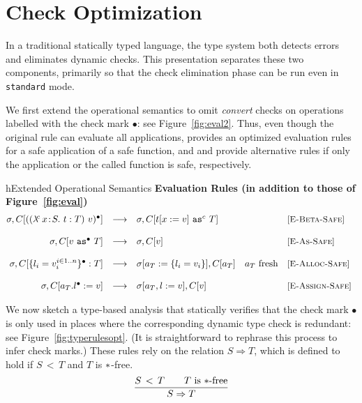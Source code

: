 \documentclass{article}
\newcommand{\myclearpage}{}
\newcommand{\safe}{\bullet}
\newcommand{\lam}[5]{\lambda\!^{#1}\,#2\!:\!#3.\,\,#5:#4}
\newcommand{\app}[3]{(#2~#3)^{#1}}
\newcommand{\dynamic}{\t{*}}
\newcommand{\cast}[3]{#2~\t{as}^{#1}~#3}
\newcommand{\subtypeword}{\,<\,}
\newcommand{\subtype}[2]{#1 \subtypeword #2}
\newcommand{\implies}[2]{#1\Implies #2}
\renewcommand{\t}[1]{{\tt #1}}
\newcommand{\Implies}[0]{\Rightarrow}
\newcommand{\red}[0]{\longrightarrow}  %
\newcommand{\lred}[0]{\red}  %
\newcommand{\objty}[1]{\{#1\}}
\newcommand{\obje}[3]{\{#2\}^{#1}:{#3}}
\newcommand{\objv}[1]{\{#1\}}
\newcommand{\objset}[4]{#2.#3^{#1}:=#4}
\begin{document}
\myclearpage
\section{Check Optimization}
\label{sec:opt}

In a traditional statically typed language, the type system both detects errors and eliminates dynamic checks.
This presentation separates these two components, primarily so that the check elimination phase 
can be run even in   \t{standard} mode.
 
We first extend the operational semantics to omit \emph{convert} checks on operations labelled with the check mark $\safe$: see Figure~\ref{fig:eval2}. Thus, even though the original rule  can evaluate all applications,  provides an optimized evaluation rules for a safe application of a safe function, and  and  provide alternative rules if only the application or the called function is safe, respectively.

\begin{displayfigure}{h}{Extended Operational Semantics}
\label{fig:eval2} 
\footnotesize
{\bf Evaluation Rules (in addition to those of Figure~\ref{fig:eval})}
\[
\begin{array}{@{}rclll}
	\sigma,C[{\app{\safe}{(\lam{c}{x}{S}{T}{t})}{v}}]
	&\lred&
	\sigma,C[\cast{c}{t[x:=v]}{T}]
	&&\rel{E-Beta-Safe}
\\~\\
	\sigma,C[\cast{\safe}{v}{T}]
	&\lred&
	\sigma,C[v]
	&&\rel{E-As-Safe}
\\~\\
	\sigma,C[\obje{\safe}{l_i=v_i^{i\in 1..n}}{T}]
	&\lred&
	\sigma[a_T:=\objv{l_i=v_i}],C[a_T] 
	&\mbox{$a_T$ fresh}
	&\rel{E-Alloc-Safe} 
\\~\\
	\sigma,C[\objset{\safe}{a_T}{l}{v}]
	&\lred&
	\sigma[a_T,l:=v],C[v] 
	& 
	&\rel{E-Assign-Safe} 
\end{array}
\]
 \end{displayfigure} 


We now sketch a type-based analysis that statically verifies that the check mark $\safe$ is only used in places where the
corresponding dynamic type check is redundant: see Figure~\ref{fig:typerulesopt}. (It is straightforward to rephrase this process to infer check marks.)
These rules rely on the relation $S\Implies T$, which is defined to hold if $\subtype S T$ and $T$ is $\dynamic$-free.
\[
\frac{\subtype S T \qquad \mbox{$T$ is $\dynamic$-free}}
	{\implies S T}
\]
\end{document}
